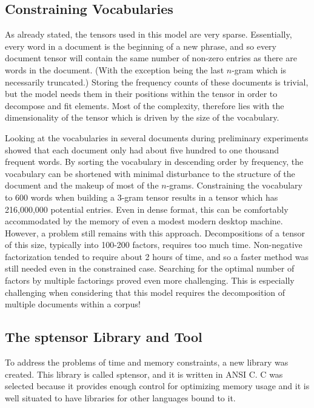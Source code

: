 \documentclass[../ut-dissertation.tex]{subfiles}
\begin{document}
\subsection{Constraining Vocabularies}
As already stated, the tensors used in this model are very sparse.
Essentially, every word in a document is the beginning of a new
phrase, and so every document tensor will contain the same number of
non-zero entries as there are words in the document.  (With the
exception being the last $n$-gram which is necessarily truncated.)
Storing the frequency counts of these documents is trivial, but the
model needs them in their positions within the tensor in order to
decompose and fit elements.  Most of the complexity, therefore lies
with the dimensionality of the tensor which is driven by the size of
the vocabulary.

Looking at the vocabularies in several documents during preliminary
experiments showed that each document only had about five hundred to
one thousand frequent words.  By sorting the vocabulary in descending
order by frequency, the vocabulary can be shortened with minimal
disturbance to the structure of the document and the makeup of most of
the $n$-grams.  Constraining the vocabulary to 600 words when building
a 3-gram tensor results in a tensor which has 216,000,000 potential
entries.  Even in dense format, this can be comfortably accommodated by
the memory of even a modest modern desktop machine.  However, a
problem still remains with this approach.  Decompositions of a tensor
of this size, typically into 100-200 factors, requires too much time.
Non-negative factorization tended to require about 2 hours of time,
and so a faster method was still needed even in the constrained case.
Searching for the optimal number of factors by multiple factorings
proved even more challenging.  This is especially challenging when
considering that this model requires the decomposition of multiple
documents within a corpus!

\subsection{The sptensor Library and Tool}
To address the problems of time and memory constraints, a new library
was created.  This library is called sptensor, and it is written in
ANSI C.  C was selected because it provides enough control for
optimizing memory usage and it is well situated to have libraries for
other languages bound to it.
\end{document}
